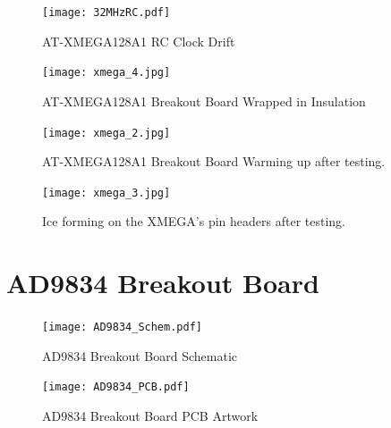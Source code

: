 \documentclass[a4paper,12pt]{article}
\begin{document}
\begin{appendices}
\begin{figure}[h!]
\begin{center}
\texttt{[image: 32MHzRC.pdf]}
\caption{AT-XMEGA128A1 RC Clock Drift}
\label{32mhzrc}
\end{center}
\end{figure}

\begin{figure}[h!]
\begin{center}
\texttt{[image: xmega\_4.jpg]}
\caption{AT-XMEGA128A1 Breakout Board Wrapped in Insulation}
\label{xmega_4}
\end{center}
\end{figure}

\newpage
\begin{figure}[h!]
\begin{center}
\texttt{[image: xmega\_2.jpg]}
\caption{AT-XMEGA128A1 Breakout Board Warming up after testing.}
\label{xmega_2}
\end{center}
\end{figure}

\begin{figure}[h!]
\begin{center}
\texttt{[image: xmega\_3.jpg]}
\caption{Ice forming on the XMEGA's pin headers after testing.}
\label{xmega_3}
\end{center}
\end{figure}

\newpage
\section{AD9834 Breakout Board}
\begin{figure}[h!]
\begin{center}
\texttt{[image: AD9834\_Schem.pdf]}
\caption{AD9834 Breakout Board Schematic}
\label{ad9834_schem}
\end{center}
\end{figure}
\begin{figure}[h!]
\begin{center}
\texttt{[image: AD9834\_PCB.pdf]}
\caption{AD9834 Breakout Board PCB Artwork}
\label{ad9834_PCB}
\end{center}
\end{figure}

\end{appendices}
\end{document}
